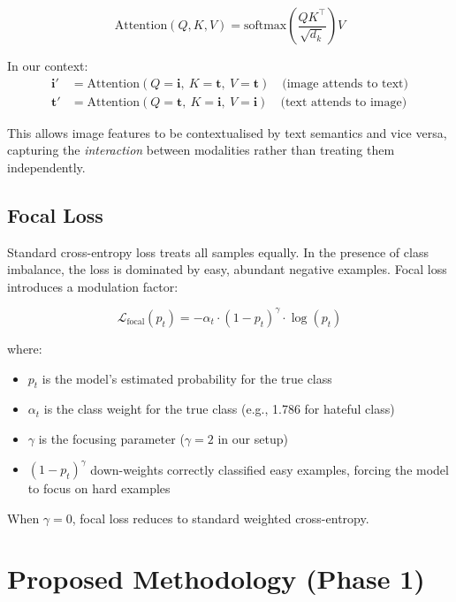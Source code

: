 \documentclass[12pt,a4paper]{article}
\begin{document}
\[
\text{Attention}(Q, K, V) = \text{softmax}\left(\frac{QK^\top}{\sqrt{d_k}}\right) V
\]

In our context:
\begin{align}
  \mathbf{i}' &= \text{Attention}(Q = \mathbf{i},\ K = \mathbf{t},\ V = \mathbf{t}) \quad \text{(image attends to text)} \\
  \mathbf{t}' &= \text{Attention}(Q = \mathbf{t},\ K = \mathbf{i},\ V = \mathbf{i}) \quad \text{(text attends to image)}
\end{align}

This allows image features to be contextualised by text semantics and vice versa, capturing the \textit{interaction} between modalities rather than treating them independently.

\subsection{Focal Loss}

Standard cross-entropy loss treats all samples equally. In the presence of class imbalance, the loss is dominated by easy, abundant negative examples. Focal loss \cite{lin2017focal} introduces a modulation factor:

\[
\mathcal{L}_\text{focal}(p_t) = -\alpha_t \cdot (1 - p_t)^\gamma \cdot \log(p_t)
\]

where:
\begin{itemize}
  \item $p_t$ is the model's estimated probability for the true class
  \item $\alpha_t$ is the class weight for the true class (e.g., 1.786 for hateful class)
  \item $\gamma$ is the focusing parameter ($\gamma = 2$ in our setup)
  \item $(1 - p_t)^\gamma$ down-weights correctly classified easy examples, forcing the model to focus on hard examples
\end{itemize}

When $\gamma = 0$, focal loss reduces to standard weighted cross-entropy.

\section{Proposed Methodology (Phase 1)}
\label{sec:methodology}
\end{document}
